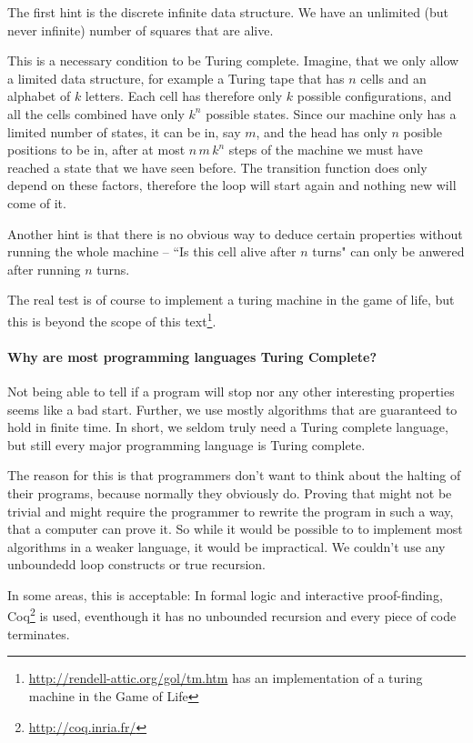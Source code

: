 The first hint is the discrete infinite data structure. We have an unlimited (but 
never infinite) number of squares that are alive. 

This is a necessary condition to be Turing complete. Imagine, that we only
allow a limited data structure, for example a Turing tape that has $n$ cells
and an alphabet of $k$ letters. Each cell has therefore only $k$ possible
configurations, and all the cells combined have only $k^n$ possible states.
Since our machine only has a limited number of states, it can be in, say $m$,
and the head has only $n$ posible positions to be in, after at most 
$n\, m\, k^n$ steps of the machine we must have reached a state that we have
seen before.  The transition function does only depend on these factors,
therefore the loop will start again and nothing new will come of it.

Another hint is that there is no obvious way to deduce certain properties 
without running the whole machine -- ``Is this cell alive after $n$ turns" 
can only be anwered after running $n$ turns.

The real test is of course to implement a turing machine in the game of life, 
but this is beyond the scope of this 
text\footnote{\url{http://rendell-attic.org/gol/tm.htm} has an 
implementation of a turing machine in the Game of Life}.

\paragraph{Why are most programming languages Turing Complete?} %
\label{sub:Why are most programming languages Turing Complete?}
Not being able to tell if a program will stop nor any other interesting 
properties seems like a bad start. Further, we use mostly algorithms that are
guaranteed to hold in finite time. In short, we seldom truly need a Turing 
complete language, but still every major programming language is Turing 
complete. 

The reason for this is that programmers don't want to think about the halting 
of their programs, because normally they obviously do. Proving that might not 
be trivial and might require the programmer to rewrite the program in such a 
way, that a computer can prove it. So while it would be possible to to 
implement most algorithms in a weaker language, it would be impractical. We
couldn't use any unboundedd loop constructs or true recursion.

In some areas, this is acceptable: In formal logic and interactive 
proof-finding, Coq\footnote{\url{http://coq.inria.fr/}} is used, eventhough it has 
no unbounded recursion and every piece of code terminates.
